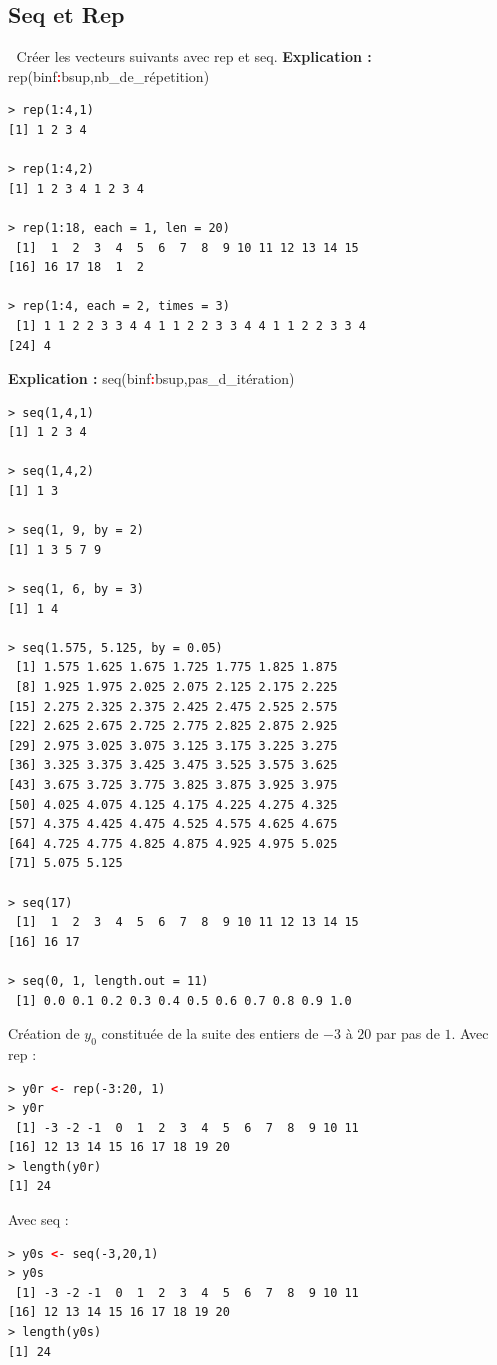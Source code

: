 \subsection{Seq et Rep}
\textcolor{white}{.}\newline
Créer les vecteurs suivants avec rep et seq.\newline
\textbf{Explication :} rep(binf\textcolor{red}{\textbf{:}}bsup,nb\_de\_répetition) \begin{lstlisting}[language=html]
> rep(1:4,1)
[1] 1 2 3 4

> rep(1:4,2)
[1] 1 2 3 4 1 2 3 4

> rep(1:18, each = 1, len = 20)
 [1]  1  2  3  4  5  6  7  8  9 10 11 12 13 14 15
[16] 16 17 18  1  2

> rep(1:4, each = 2, times = 3)
 [1] 1 1 2 2 3 3 4 4 1 1 2 2 3 3 4 4 1 1 2 2 3 3 4
[24] 4
\end{lstlisting}
\textbf{Explication :} seq(binf\textcolor{red}{\textbf{:}}bsup,pas\_d\_itération)
\begin{lstlisting}[language=html]
> seq(1,4,1)
[1] 1 2 3 4

> seq(1,4,2)
[1] 1 3

> seq(1, 9, by = 2)
[1] 1 3 5 7 9

> seq(1, 6, by = 3)
[1] 1 4

> seq(1.575, 5.125, by = 0.05)
 [1] 1.575 1.625 1.675 1.725 1.775 1.825 1.875
 [8] 1.925 1.975 2.025 2.075 2.125 2.175 2.225
[15] 2.275 2.325 2.375 2.425 2.475 2.525 2.575
[22] 2.625 2.675 2.725 2.775 2.825 2.875 2.925
[29] 2.975 3.025 3.075 3.125 3.175 3.225 3.275
[36] 3.325 3.375 3.425 3.475 3.525 3.575 3.625
[43] 3.675 3.725 3.775 3.825 3.875 3.925 3.975
[50] 4.025 4.075 4.125 4.175 4.225 4.275 4.325
[57] 4.375 4.425 4.475 4.525 4.575 4.625 4.675
[64] 4.725 4.775 4.825 4.875 4.925 4.975 5.025
[71] 5.075 5.125

> seq(17)
 [1]  1  2  3  4  5  6  7  8  9 10 11 12 13 14 15
[16] 16 17

> seq(0, 1, length.out = 11)
 [1] 0.0 0.1 0.2 0.3 0.4 0.5 0.6 0.7 0.8 0.9 1.0
\end{lstlisting}
Création de $y_{0}$ constituée de la suite des entiers de $-3$ à $20$ par pas de $1$.\newline
Avec rep :
\begin{lstlisting}[language=html]
> y0r <- rep(-3:20, 1)
> y0r
 [1] -3 -2 -1  0  1  2  3  4  5  6  7  8  9 10 11
[16] 12 13 14 15 16 17 18 19 20
> length(y0r)
[1] 24
\end{lstlisting}
Avec seq : 
\begin{lstlisting}[language=html]
> y0s <- seq(-3,20,1)
> y0s
 [1] -3 -2 -1  0  1  2  3  4  5  6  7  8  9 10 11
[16] 12 13 14 15 16 17 18 19 20
> length(y0s)
[1] 24
\end{lstlisting}
